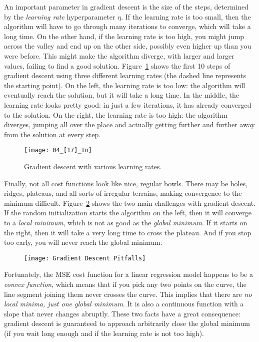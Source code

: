 An important parameter in gradient descent is the size of the steps, determined by the \emph{learning rate} hyperparameter $\eta$. If the learning rate is too small, then the algorithm will have to go through many iterations to converge, which will take a long time. On the other hand, if the learning rate is too high, you might jump across the valley and end up on the other side, possibly even higher up than you were before. This might make the algorithm diverge, with larger and larger values, failing to find a good solution. Figure~\ref{04_[17]_In} shows the first 10 steps of gradient descent using three different learning rates (the dashed line represents the starting point). On the left, the learning rate is too low: the algorithm will eventually reach the solution, but it will take a long time. In the middle, the learning rate looks pretty good: in just a few iterations, it has already converged to the solution. On the right, the learning rate is too high: the algorithm diverges, jumping all over the place and actually getting further and further away from the solution at every step.
\begin{figure}[h!t]
\centering
\texttt{[image: 04\_[17]\_In]}
\caption{Gradient descent with various learning rates.}\label{04_[17]_In}
\end{figure}

Finally, not all cost functions look like nice, regular bowls. There may be holes, ridges, plateaus, and all sorts of irregular terrains, making convergence to the minimum difficult. Figure~\ref{GradientDescentPitfalls} shows the two main challenges with gradient descent. If the random initialization starts the algorithm on the left, then it will converge to a \emph{local minimum}, which is not as good as the \emph{global minimum}. If it starts on the right, then it will take a very long time to cross the plateau. And if you stop too early, you will never reach the global minimum.
\begin{figure}[h!t]
\centering
\texttt{[image: Gradient Descent Pitfalls]}
\caption{}\label{GradientDescentPitfalls}
\end{figure}

Fortunately, the MSE cost function for a linear regression model happens to be a \emph{convex function}, which means that if you pick any two points on the curve, the line segment joining them never crosses the curve. This implies that there are \emph{no local minima, just one global minimum}. It is also a continuous function with a slope that never changes abruptly. These two facts have a great consequence: gradient descent is guaranteed to approach arbitrarily close the global minimum (if you wait long enough and if the learning rate is not too high).


